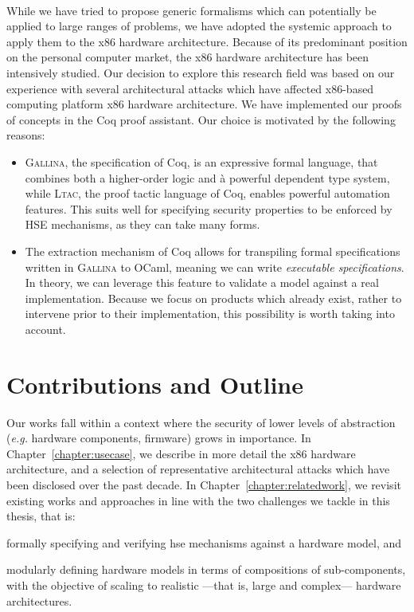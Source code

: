 \paragraph{}
%
While we have tried to propose generic formalisms which can potentially be
applied to large ranges of problems, we have adopted the systemic approach to
apply them to the x86 hardware architecture.
%
Because of its predominant position on the personal computer market, the x86
hardware architecture has been intensively studied.
%
Our decision to explore this research field was based on our experience with
several architectural attacks which have affected x86-based computing platform
x86 hardware architecture.
%
We have implemented our proofs of concepts in the Coq proof assistant.
%
Our choice is motivated by the following reasons:
%
\begin{itemize}
\item {\scshape Gallina}, the specification of Coq, is an expressive formal
  language, that combines both a higher-order logic and à powerful dependent
  type system, while {\scshape Ltac}, the proof tactic language of Coq, enables
  powerful automation features.
  This suits well for specifying security properties to be enforced by HSE
  mechanisms, as they can take many forms.
\item The extraction mechanism of Coq allows for transpiling formal
  specifications written in {\scshape Gallina} to OCaml, meaning we can write
  \emph{executable specifications}.
  In theory, we can leverage this feature to validate a model against a real
  implementation.
  Because we focus on products which already exist, rather to intervene prior to
  their implementation, this possibility is worth taking into account.
\end{itemize}

\section{Contributions and Outline}

Our works fall within a context where the security of lower levels of
abstraction (\emph{e.g.} hardware components, firmware) grows in importance.
%
In Chapter~\ref{chapter:usecase}, we describe in more detail the x86 hardware
architecture, and a selection of representative architectural attacks which have
been disclosed over the past decade.
%
In Chapter~\ref{chapter:relatedwork}, we revisit existing works and approaches
in line with the two challenges we tackle in this thesis, that is:
%
\begin{inparaenum}[(1)]
\item formally specifying and verifying \ac{hse} mechanisms against a hardware
  model, and
%
\item modularly defining hardware models in terms of compositions of
  sub-components, with the objective of scaling to realistic ---that is, large
  and complex--- hardware architectures.
\end{inparaenum}

